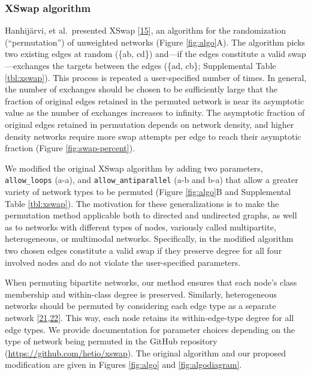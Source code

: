 \hypertarget{xswap-algorithm}{%
\subsubsection{XSwap algorithm}\label{xswap-algorithm}}

Hanhijärvi, et al.~presented XSwap {[}\protect\hyperlink{ref-iKOIEzQ9}{15}{]}, an algorithm for the randomization (``permutation'') of unweighted networks (Figure \ref{fig:algo}A).
The algorithm picks two existing edges at random (\{ab, cd\}) and---if the edges constitute a valid swap---exchanges the targets between the edges (\{ad, cb\}; Supplemental Table \ref{tbl:xswap}).
This process is repeated a user-specified number of times.
In general, the number of exchanges should be chosen to be sufficiently large that the fraction of original edges retained in the permuted network is near its asymptotic value as the number of exchanges increases to infinity.
The asymptotic fraction of original edges retained in permutation depends on network density, and higher density networks require more swap attempts per edge to reach their asymptotic fraction (Figure \ref{fig:swap-percent}).

We modified the original XSwap algorithm by adding two parameters, \texttt{allow\_loops} (a-a), and \texttt{allow\_antiparallel} (a-b and b-a) that allow a greater variety of network types to be permuted (Figure \ref{fig:algo}B and Supplemental Table \ref{tbl:xswap}).
The motivation for these generalizations is to make the permutation method applicable both to directed and undirected graphs, as well as to networks with different types of nodes, variously called multipartite, heterogeneous, or multimodal networks.
Specifically, in the modified algorithm two chosen edges constitute a valid swap if they preserve degree for all four involved nodes and do not violate the user-specified parameters.

When permuting bipartite networks, our method ensures that each node's class membership and within-class degree is preserved.
Similarly, heterogeneous networks should be permuted by considering each edge type as a separate network {[}\protect\hyperlink{ref-WkPlH1ds}{21},\protect\hyperlink{ref-xmFxwmUd}{22}{]}.
This way, each node retains its within-edge-type degree for all edge types.
We provide documentation for parameter choices depending on the type of network being permuted in the GitHub repository (\url{https://github.com/hetio/xswap}).
The original algorithm and our proposed modification are given in Figures \ref{fig:algo} and \ref{fig:algodiagram}.

